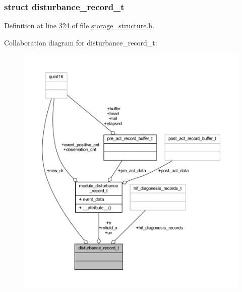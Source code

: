 \subsubsection{struct disturbance\+\_\+record\+\_\+t}


Definition at line \hyperlink{a00003_source_l00324}{324} of file \hyperlink{a00003_source}{storage\+\_\+structure.\+h}.



Collaboration diagram for disturbance\+\_\+record\+\_\+t\+:
\nopagebreak
\begin{figure}[H]
\begin{center}
\leavevmode
\includegraphics[width=350pt]{d5/d0b/a00220}
\end{center}
\end{figure}

